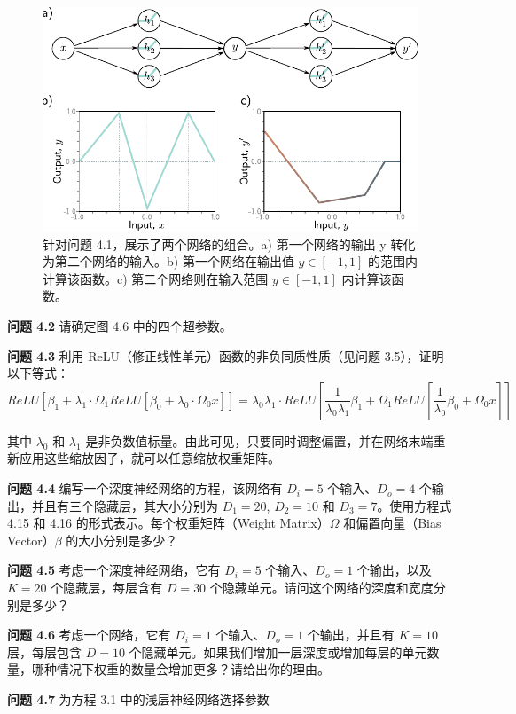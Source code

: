 \documentclass[lang=cn,newtx,10pt,scheme=chinese]{elegantbook}
\begin{document}
\begin{figure}[ht!]
	\centering
	\includegraphics[width=0.7\linewidth]{PDFFigures/UDLChap4PDF/DeepConcatQuestion.pdf}
	\caption{针对问题 4.1，展示了两个网络的组合。a) 第一个网络的输出 y 转化为第二个网络的输入。b) 第一个网络在输出值 \(y \in [−1, 1]\) 的范围内计算该函数。c) 第二个网络则在输入范围 \(y \in [−1, 1]\) 内计算该函数。}
\end{figure}

\textbf{问题 4.2} 请确定图 4.6 中的四个超参数。

\textbf{问题 4.3} 利用 ReLU（修正线性单元）函数的非负同质性质（见问题 3.5），证明以下等式：
\begin{equation}
ReLU[\beta_1 + \lambda_1 \cdot \Omega_1 ReLU[\beta_0 + \lambda_0 \cdot \Omega_0 x]] = \lambda_0\lambda_1 · ReLU[\frac{1}{\lambda_0\lambda_1} \beta_1 + \Omega_1 ReLU[\frac{1}{\lambda_0} \beta_0 + \Omega_0 x]]  
\end{equation}

其中 \(\lambda_0\) 和 \(\lambda_1\) 是非负数值标量。由此可见，只要同时调整偏置，并在网络末端重新应用这些缩放因子，就可以任意缩放权重矩阵。

\textbf{问题 4.4} 编写一个深度神经网络的方程，该网络有 \(D_i = 5\) 个输入、\(D_o = 4\) 个输出，并且有三个隐藏层，其大小分别为 \(D_1 = 20\), \(D_2 = 10\) 和 \(D_3 = 7\)。使用方程式 4.15 和 4.16 的形式表示。每个权重矩阵（Weight Matrix）\(\Omega\) 和偏置向量（Bias Vector）\(\beta\) 的大小分别是多少？

\textbf{问题 4.5} 考虑一个深度神经网络，它有 \(D_i = 5\) 个输入、\(D_o = 1\) 个输出，以及 \(K = 20\) 个隐藏层，每层含有 \(D = 30\) 个隐藏单元。请问这个网络的深度和宽度分别是多少？

\textbf{问题 4.6} 考虑一个网络，它有 \(D_i = 1\) 个输入、\(D_o = 1\) 个输出，并且有 \(K = 10\) 层，每层包含 \(D = 10\) 个隐藏单元。如果我们增加一层深度或增加每层的单元数量，哪种情况下权重的数量会增加更多？请给出你的理由。

\textbf{问题 4.7} 为方程 3.1 中的浅层神经网络选择参数 
\end{document}
